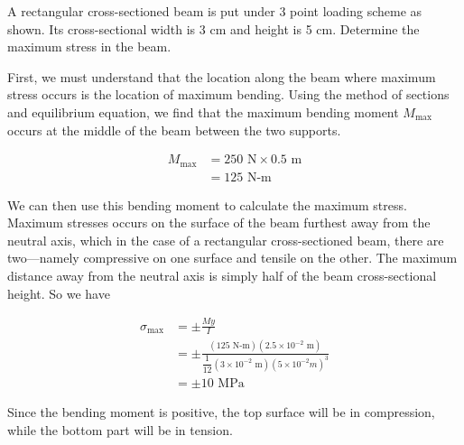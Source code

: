 \documentclass[
10pt,
a4paper,
openany,
svgnames,
]{book} %
\begin{document}
\begin{example}
  A rectangular cross-sectioned beam is put under 3 point loading scheme as shown. Its cross-sectional width is 3 cm and height is 5 cm. Determine the maximum stress in the beam.

  \begin{figure}[H]
    \centering
  \end{figure}
\end{example}

\begin{solution}
  First, we must understand that the location along the beam where maximum stress occurs is the location of maximum bending. Using the method of sections and equilibrium equation, we find that the maximum bending moment $M_{\max}$ occurs at the middle of the beam between the two supports.

  \begin{align*}
    M_{\max} &= 250 \text{ N} \times 0.5 \text{ m} \\
             &= 125 \text{ N-m}
  \end{align*}
  
  We can then use this bending moment to calculate the maximum stress. Maximum stresses occurs on the surface of the beam furthest away from the neutral axis, which in the case of a rectangular cross-sectioned beam, there are two—namely compressive on one surface and tensile on the other. The maximum distance away from the neutral axis is simply half of the beam cross-sectional height. So we have
  
  \begin{align*}
    \sigma_{\max} &= \pm \frac{My}{I} \\
                  &= \pm \frac{(125 \text{ N-m})(2.5 \times 10^{-2} \text{ m})}{ \dfrac{1}{12}(3 \times 10^{-2} \text{ m})(5 \times 10^{-2} m)^3} \\
                  &= \pm 10 \text{ MPa}
  \end{align*}
  
Since the bending moment is positive, the top surface will be in compression, while the bottom part will be in tension.
\end{solution}
\end{document}
